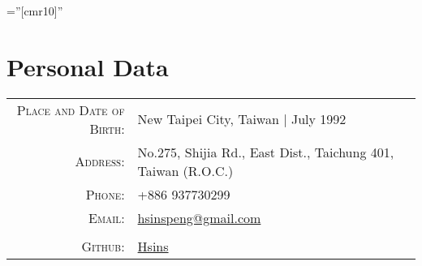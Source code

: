 \documentclass[a4paper,10pt]{article}
\begin{document}
\pagestyle{empty}                   %
\font\fb=''[cmr10]''                %

\par{\bigskip \par}

\section{Personal Data}
\begin{tabular}{rl}
  \textsc{Place and Date of Birth:} & New Taipei City, Taiwan | July 1992                                   \\
  \textsc{Address:}                 & No.275, Shijia Rd., East Dist., Taichung 401, Taiwan (R.O.C.)         \\
  \textsc{Phone:}                   & +886 937730299                                                        \\
  \textsc{Email:}                   & \href{mailto:hsinspeng@gmail.com}{hsinspeng@gmail.com}                \\
                                    &                                                                       \\
  \textsc{Github:}                  & \href{https://github.com/Hsins}{Hsins}
\end{tabular}

\end{document}
